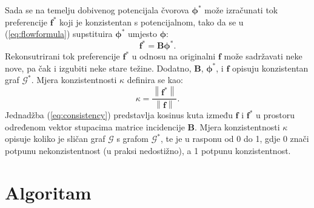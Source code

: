 \documentclass[lmodern, utf8, diplomski, numeric]{fer}
\newcommand{\matr}[1]{\mathbold{#1}}
\newcommand{\graph}[1]{\mathcal{#1}}
\begin{document}
  Sada se na temelju dobivenog potencijala čvorova $\matr{\phi^*}$ može izračunati tok preferencije $\matr{f^*}$ koji je konzistentan s potencijalnom, tako da se u (\ref{eq:flowformula}) supstituira $\matr{\phi^*}$ umjesto $\matr{\phi}$:
  \begin{equation}
  \matr{f^*} = \matr{B} \matr{\phi^*}.
  \end{equation}
  Rekonsutrirani tok preferencije $\matr{f^*}$ u odnosu na originalni $\matr{f}$ može sadržavati neke nove, pa čak i izgubiti neke stare težine.
  Dodatno, $\matr{B}$, $\matr{\phi^*}$, i $\matr{f}$ opisuju konzistentan graf $\graph{G}^*$.
  Mjera konzistentnosti $\kappa$ definira se kao:
  \begin{equation}
  \label{eq:consistency}
  \kappa = \frac{\left \lVert \matr{f^*} \right \rVert}{\left \lVert \matr{f} \right \rVert}.
  \end{equation}
  Jednadžba (\ref{eq:consistency}) predstavlja kosinus kuta između $\matr{f}$ i $\matr{f^*}$ u prostoru određenom vektor stupacima matrice incidencije $\matr{B}$.
  Mjera konzistentnosti $\kappa$ opisuje koliko je sličan graf $\graph{G}$ s grafom $\graph{G}^*$, te je u rasponu od 0 do 1, gdje 0 znači potpunu nekonzistentnost (u praksi nedostižno), a 1 potpunu konzistentnost.
  
  
\chapter{Algoritam}
\end{document}

